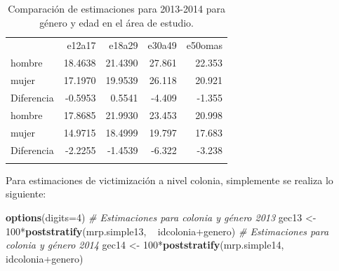 \documentclass[]{article}
\newenvironment{Shaded}{\begin{snugshade}}{\end{snugshade}}
\newcommand{\KeywordTok}[1]{\textcolor[rgb]{0.13,0.29,0.53}{\textbf{{#1}}}}
\newcommand{\DataTypeTok}[1]{\textcolor[rgb]{0.13,0.29,0.53}{{#1}}}
\newcommand{\DecValTok}[1]{\textcolor[rgb]{0.00,0.00,0.81}{{#1}}}
\newcommand{\StringTok}[1]{\textcolor[rgb]{0.31,0.60,0.02}{{#1}}}
\newcommand{\CommentTok}[1]{\textcolor[rgb]{0.56,0.35,0.01}{\textit{{#1}}}}
\newcommand{\NormalTok}[1]{{#1}}
\begin{document}
\begin{longtable}[c]{@{}lrrrr@{}}
\toprule\addlinespace
& e12a17 & e18a29 & e30a49 & e50omas
\\\addlinespace
\midrule\endhead
hombre & 18.4638 & 21.4390 & 27.861 & 22.353
\\\addlinespace
mujer & 17.1970 & 19.9539 & 26.118 & 20.921
\\\addlinespace
Diferencia & -0.5953 & 0.5541 & -4.409 & -1.355
\\\addlinespace
hombre & 17.8685 & 21.9930 & 23.453 & 20.998
\\\addlinespace
mujer & 14.9715 & 18.4999 & 19.797 & 17.683
\\\addlinespace
Diferencia & -2.2255 & -1.4539 & -6.322 & -3.238
\\\addlinespace
\bottomrule
\addlinespace
\caption{Comparación de estimaciones para 2013-2014 para género y edad
en el área de estudio.}
\end{longtable}

Para estimaciones de victimización a nivel colonia, simplemente se
realiza lo siguiente:

\begin{Shaded}
\begin{Highlighting}[]
\KeywordTok{options}\NormalTok{(}\DataTypeTok{digits=}\DecValTok{4}\NormalTok{)}
\CommentTok{# Estimaciones para colonia y género 2013}
\NormalTok{gec13 <-}\StringTok{ }\DecValTok{100}\NormalTok{*}\KeywordTok{poststratify}\NormalTok{(mrp.simple13, ~}\StringTok{ }\NormalTok{idcolonia+genero)}
\CommentTok{# Estimaciones para colonia y género 2014}
\NormalTok{gec14 <-}\StringTok{ }\DecValTok{100}\NormalTok{*}\KeywordTok{poststratify}\NormalTok{(mrp.simple14, ~}\StringTok{ }\NormalTok{idcolonia+genero)}
\end{Highlighting}
\end{Shaded}
\end{document}
